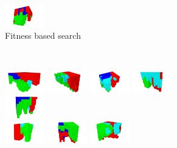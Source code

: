 \begin{figure}
\begin{subfigure}[b]{1.0\textwidth}
\includegraphics[width=0.19\textwidth]{../Figures/Robots/f_4_g_1000.jpg}
\caption{Fitness based search}
\end{subfigure}\\
\begin{subfigure}[b]{1.0\textwidth}
\includegraphics[width=0.19\textwidth]{../Figures/Robots/n_4_g_100.jpg}
\includegraphics[width=0.19\textwidth]{../Figures/Robots/n_4_g_200.jpg}
\includegraphics[width=0.19\textwidth]{../Figures/Robots/n_4_g_300.jpg}
\includegraphics[width=0.19\textwidth]{../Figures/Robots/n_4_g_400.jpg}
\includegraphics[width=0.19\textwidth]{../Figures/Robots/n_4_g_500.jpg}\\
\includegraphics[width=0.19\textwidth]{../Figures/Robots/n_4_g_600.jpg}
\includegraphics[width=0.19\textwidth]{../Figures/Robots/n_4_g_700.jpg}
\includegraphics[width=0.19\textwidth]{../Figures/Robots/n_4_g_800.jpg}

\end{subfigure}
\end{figure}
